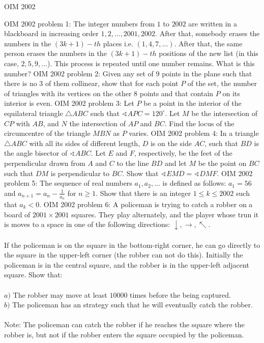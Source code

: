 OIM 2002 

OIM 2002 problem 1:  The integer numbers from $1$ to $2002$ are written in a blackboard in increasing order $1,2,\ldots, 2001,2002$. After that, somebody erases the numbers in the $ (3k+1)-th$ places i.e. $(1,4,7,\dots)$. After that, the same person erases the numbers in the $(3k+1)-th$ positions of the new list (in this case, $2,5,9,\ldots$). This process is repeated until one number remains. What is this number? 
OIM 2002 problem 2:  Given any set of $9$ points in the plane such that there is no $3$ of them collinear, show that for each point $P$ of the set, the number of triangles with its vertices on the other $8$ points and that contain $P$ on its interior is even. 
OIM 2002 problem 3:  Let $P$ be a point in the interior of the equilateral triangle $\triangle ABC$ such that $\sphericalangle{APC}=120^\circ$. Let $M$ be the intersection of $CP$ with $AB$, and $N$ the intersection of $AP$ and $BC$. Find the locus of the circumcentre of the triangle $MBN$ as $P$ varies. 
OIM 2002 problem 4:  In a triangle $\triangle{ABC}$ with all its sides of different length, $D$ is on the side $AC$, such that $BD$ is the angle bisector of $\sphericalangle{ABC}$. Let $E$ and $F$, respectively, be the feet of the perpendicular drawn from $A$ and $C$ to the line $BD$ and let $M$ be the point on $BC$ such that $DM$ is perpendicular to $BC$. Show that $\sphericalangle{EMD}=\sphericalangle{DMF}$. 
OIM 2002 problem 5:  The sequence of real numbers $a_1,a_2,\dots$ is defined as follows: $a_1=56$ and $a_{n+1}=a_n-\frac{1}{a_n}$ for $n\ge 1$. Show that there is an integer $1\leq{k}\leq2002$ such that $a_k<0$. 
OIM 2002 problem 6:  A policeman is trying to catch a robber on a board of $2001\times2001$ squares. They play alternately, and the player whose trun it is moves to a space in one of the following directions: $\downarrow,\rightarrow,\nwarrow$. \\\\
If the policeman is on the square in the bottom-right corner, he can go directly to the square in the upper-left corner (the robber can not do this). Initially the policeman is in the central square, and the robber is in the upper-left adjacent square. Show that: \\\\
$a)$ The robber may move at least $10000$ times before the being captured. \\
$b)$ The policeman has an strategy such that he will eventually catch the robber. \\\\
Note: The policeman can catch the robber if he reaches the square where the robber is, but not if the robber enters the square occupied by the policeman. 

